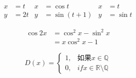\documentclass{ctexart}
\begin{document}
	\begin{align*}
	x &= t & x &=\cos t & x &= t \\
	y &=2t & y &=\sin (t+1) & y &= \sin t
	\end{align*}
	
	
	\begin{equation}
		\begin{split}
		\cos 2x &= \cos^2 x - \sin^2 x\\
		&= x\cos^2 x - 1
		\end{split}
	\end{equation}	
	
	\begin{equation}
	D(x)= \begin{cases}
		1, &\text{如果} x \in \mathbb{Q}\\
		0, &if x \in \mathbb{R}\setminus\mathbb{Q}
	\end{cases}
	\end{equation}
	
\end{document}

